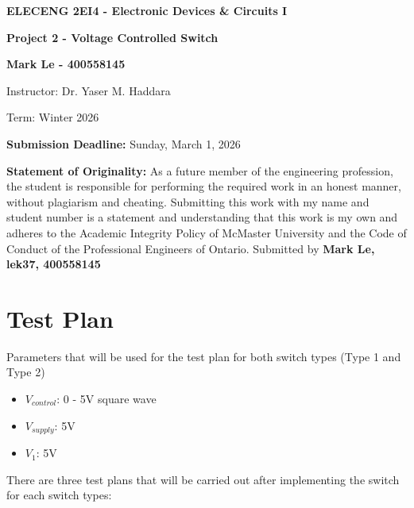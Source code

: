 \documentclass[12pt]{article}
\begin{document}
    
    \begin{titlepage}
    \begin{center}
    \vspace*{\fill}

    {\LARGE \textbf{ELECENG 2EI4 - Electronic Devices \& Circuits I}\par}
    \vspace{2.5cm}

    {\LARGE\bfseries Project 2 - Voltage Controlled Switch\par}
    \vspace{2.5cm}
    
    {\Large \textbf{Mark Le - 400558145}\par}
    \vspace{2.5cm}
    
    {\large Instructor: Dr. Yaser M. Haddara\par}
    \vspace{0.5cm}
    {\large Term: Winter 2026 \par}
    \vspace{0.5cm}
    
    {\large \textbf{Submission Deadline:} Sunday, March 1, 2026\par}
    \end{center}

    \vspace*{\fill}

    \textbf{Statement of Originality:} As a future member of the engineering profession, the student is responsible for performing the required work in an honest manner, without plagiarism and cheating. Submitting this work with my name and student number is a statement and understanding that this work is my own and adheres to the Academic Integrity Policy of McMaster University and the Code of Conduct of the Professional Engineers of Ontario. Submitted by \textbf{Mark Le, lek37, 400558145}

\end{titlepage}

    \newpage
    \tableofcontents

    \listoffigures


    \newpage
    \section{Test Plan}

    Parameters that will be used for the test plan for both switch types (Type 1 and Type 2)
    \begin{itemize}
        \item \(V_{control}\): 0 - 5V square wave
        \item \(V_{supply}\): 5V
        \item \(V_1\): 5V
    \end{itemize}
    There are three test plans that will be carried out after implementing the switch for each switch types:
\end{document}
